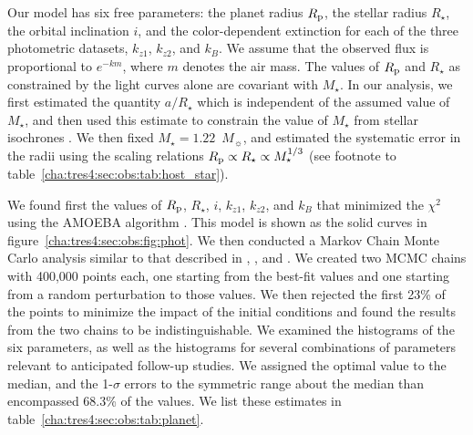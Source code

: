 Our model has six free parameters: the planet radius $R_{\rm p}$, the stellar 
radius $R_{\star}$, the orbital inclination $i$, and the color-dependent extinction for each of the three photometric datasets, 
$k_{z1}$, $k_{z2}$, and $k_B$. We assume that the observed flux is proportional 
to $e^{-km}$, where $m$ denotes the air mass. The values of $R_{\rm p}$ and 
$R_{\star}$ as constrained by the light curves alone are covariant with 
$M_{\star}$. In our analysis, we first estimated the quantity $a / R_{\star}$ which 
is independent of the assumed value of $M_{\star}$, and then used this estimate 
to constrain the value of $M_{\star}$ from stellar isochrones 
\citep{Sozzetti_Torres_Charbonneau:apj:2007a, Holman_Winn_Latham:apj:2007a}. We then fixed $M_{\star} = 1.22$~$M_{\sun}$, and 
estimated the systematic error in the radii using the scaling 
relations $R_{\rm p} \propto R_{\star} \propto M_{\star}^{1/3}$ (see footnote to 
table~\ref{cha:tres4:sec:obs:tab:host_star}).

We found first the values of $R_{\rm p}$, $R_{\star}$, $i$, $k_{z1}$, $k_{z2}$, 
and $k_B$ that minimized the ${\chi}^{2}$ using the AMOEBA algorithm 
\citep{Press_Teukolsky_Vetterling:1992a}. This model is shown as the solid curves in figure~\ref{cha:tres4:sec:obs:fig:phot}. 
We then conducted a Markov Chain Monte Carlo analysis similar to that described 
in \citet{Holman_Winn_Latham:apj:2006a}, \citet{Charbonneau_Winn_Everett:apj:2007a}, and \citet{Winn_Holman_Roussanova:apj:2007a}. 
We created two MCMC chains 
with 400,000 points each, one starting from the best-fit values and one 
starting from a random perturbation to those values. We 
then rejected the first 23\% of the points to minimize the impact of 
the initial conditions and found the results from the two chains to be 
indistinguishable. We examined the histograms of the six parameters, as well as 
the histograms for several combinations of parameters relevant to anticipated 
follow-up studies. We assigned the optimal value to the median, and the 
1-$\sigma$ errors to the symmetric range about the median than encompassed 
68.3\% of the values. We list these estimates in table~\ref{cha:tres4:sec:obs:tab:planet}. 

